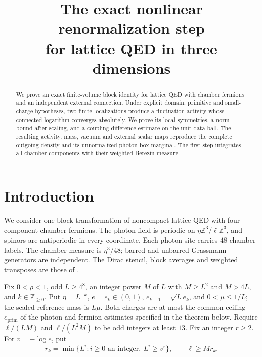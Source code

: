 \documentclass[11pt,letterpaper,reqno]{amsart}
\title[The exact nonlinear renormalization step]
{The exact nonlinear renormalization step\\for lattice QED in three dimensions}
\date{}
\newcommand{\Z}{\mathbb Z}
\begin{document}
\begin{abstract}
We prove an exact finite-volume block identity for lattice QED with
chamber fermions and an independent external connection. Under explicit
domain, primitive and small-charge hypotheses, two finite localizations
produce a fluctuation activity whose connected logarithm converges
absolutely. We prove its local symmetries, a norm bound after scaling,
and a coupling-difference estimate on the unit data ball. The resulting
activity, mass, vacuum and external scalar maps reproduce the complete
outgoing density and its unnormalized photon-box marginal. The first
step integrates all chamber components with their weighted Berezin
measure.
\end{abstract}
\maketitle
\tableofcontents
\section{Introduction}\label{sec:introduction}

We consider one block transformation of noncompact lattice QED with
four-component chamber fermions. The photon field is periodic on
$\eta\Z^3/\ell\Z^3$, and spinors are antiperiodic in every coordinate.
Each photon site carries $48$ chamber labels. The chamber measure is
$\eta^3/48$; barred and unbarred Grassmann generators are independent.
The Dirac stencil, block averages and weighted transposes are those of
\cite[\S1]{FermionBlockManuscript}.

Fix \(0<\rho<1\), odd \(L\ge4^8\), an integer power \(M\) of \(L\) with \(M\ge L^2\) and \(M>4L\),
and \(k\in\Z_{\ge0}\). Put \(\eta=L^{-k}\), \(e=e_k\in(0,1)\),
\(e_{k+1}=\sqrt L e_k\), and \(0<\mu\le1/L\); the scaled reference
mass is \(L\mu\). Both charges are at most the common ceiling $e_{\mathrm{prim}}$ of the
photon and fermion estimates specified in the theorem below. Require
\(\ell/(LM)\) and \(\ell/(L^2M)\) to be odd integers at least \(13\).
Fix an integer \(r\ge2\). For \(v=-\log e\), put
\[
 r_k=\min\{L^i:i\ge0\text{ an integer},\ L^i\ge v^r\},
 \qquad \ell\ge Mr_k .
\]
\end{document}
